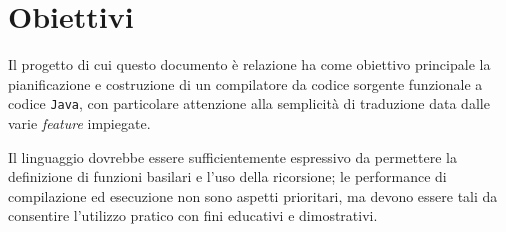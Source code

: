 \section{Obiettivi}
\label{sec:1-2-objectives}

Il progetto di cui questo documento è relazione ha come obiettivo principale la pianificazione e costruzione
di un compilatore da codice sorgente funzionale a codice \texttt{Java}, con particolare attenzione alla semplicità
di traduzione data dalle varie \textit{feature} impiegate.


Il linguaggio dovrebbe essere sufficientemente espressivo da permettere la definizione di funzioni basilari
e l'uso della ricorsione; le performance di compilazione ed esecuzione non sono aspetti prioritari,
ma devono essere tali da consentire l'utilizzo pratico con fini educativi e dimostrativi. 